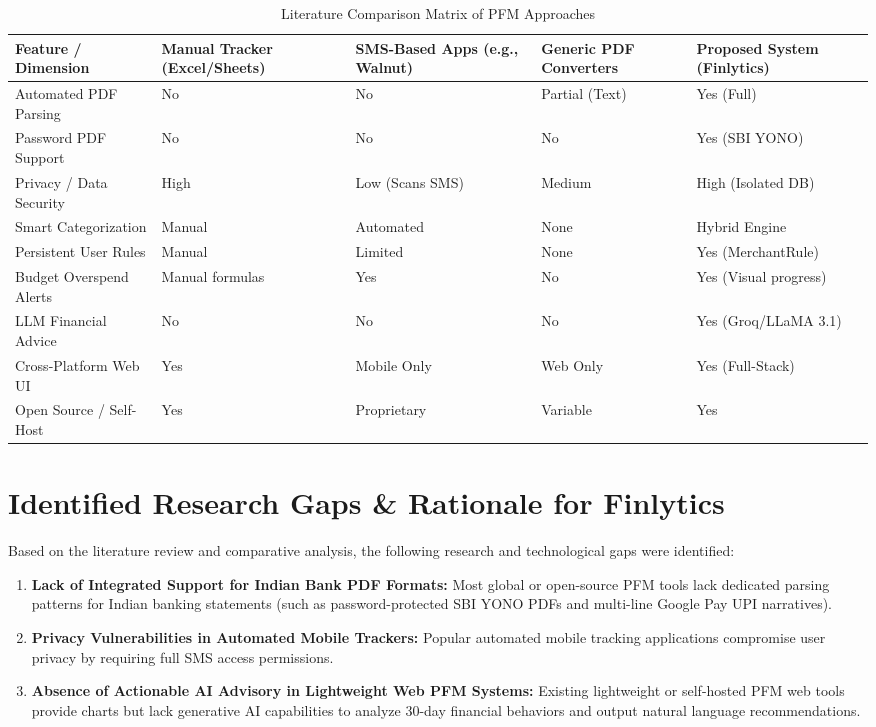 \documentclass[../Project-Report-Main.tex]{subfiles}
\begin{document}
\begin{table}[htbp]
  \centering
  \caption{Literature Comparison Matrix of PFM Approaches}
  \label{tab:lit_comparison}
  \small
  \begin{tabular}{|p{1.4in}|p{1.0in}|p{1.1in}|p{1.1in}|p{1.3in}|}
    \hline
    \textbf{Feature / Dimension} & \textbf{Manual Tracker (Excel/Sheets)} & \textbf{SMS-Based Apps (e.g., Walnut)} & \textbf{Generic PDF Converters} & \textbf{Proposed System (Finlytics)} \\
    \hline
    Automated PDF Parsing & No & No & Partial (Text) & Yes (Full) \\
    \hline
    Password PDF Support & No & No & No & Yes (SBI YONO) \\
    \hline
    Privacy / Data Security & High & Low (Scans SMS) & Medium & High (Isolated DB) \\
    \hline
    Smart Categorization & Manual & Automated & None & Hybrid Engine \\
    \hline
    Persistent User Rules & Manual & Limited & None & Yes (MerchantRule) \\
    \hline
    Budget Overspend Alerts & Manual formulas & Yes & No & Yes (Visual progress) \\
    \hline
    LLM Financial Advice & No & No & No & Yes (Groq/LLaMA 3.1) \\
    \hline
    Cross-Platform Web UI & Yes & Mobile Only & Web Only & Yes (Full-Stack) \\
    \hline
    Open Source / Self-Host & Yes & Proprietary & Variable & Yes \\
    \hline
  \end{tabular}
\end{table}

\section{Identified Research Gaps \& Rationale for Finlytics}

Based on the literature review and comparative analysis, the following research and technological gaps were identified:

\begin{enumerate}
 \item \textbf{Lack of Integrated Support for Indian Bank PDF Formats:} Most global or open-source PFM tools lack dedicated parsing patterns for Indian banking statements (such as password-protected SBI YONO PDFs and multi-line Google Pay UPI narratives).
 \item \textbf{Privacy Vulnerabilities in Automated Mobile Trackers:} Popular automated mobile tracking applications compromise user privacy by requiring full SMS access permissions.
 \item \textbf{Absence of Actionable AI Advisory in Lightweight Web PFM Systems:} Existing lightweight or self-hosted PFM web tools provide charts but lack generative AI capabilities to analyze 30-day financial behaviors and output natural language recommendations.
\end{enumerate}
\end{document}
